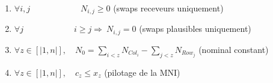 \documentclass[12pt,a4paper]{report}
\begin{document}
\begin{enumerate}
    \item $ \forall i,j  \qquad \qquad \qquad  N_{i,j} \geq 0 $ \qquad \qquad \qquad  \qquad (swaps receveurs uniquement)
    \item $ \forall j   \qquad \qquad \qquad i \geq j  \Rightarrow \  N_{i,j} = 0 $ \quad \qquad  \qquad (swaps plausibles uniquement)
    \item $ \forall z \in [|1,n|], \quad N_0 = \sum\limits_{i < z} N_{Col_i} - \sum\limits_{j < z} N_{Row_j}  $ \quad (nominal constant)
    \item $ \forall z \in [|1,n|], \quad c_z \leq x_z  $  \qquad  \qquad  \qquad  \qquad  \qquad (pilotage de la MNI)
\end{enumerate}
\end{document}
